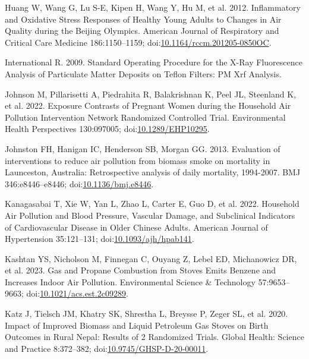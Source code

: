 \documentclass[
  letterpaper,
  DIV=11,
  numbers=noendperiod]{scrartcl}
\newlength{\cslhangindent}
\newlength{\cslentryspacingunit} %
\newenvironment{CSLReferences}[2] %
 {%
  \setlength{\parindent}{0pt}
  \ifodd #1
  \let\oldpar\par
  \def\par{\hangindent=\cslhangindent\oldpar}
  \fi
  \setlength{\parskip}{#2\cslentryspacingunit}
 }%
 {}
\begin{document}
\begin{CSLReferences}{1}{0}
\leavevmode{}%
Huang W, Wang G, Lu S-E, Kipen H, Wang Y, Hu M, et al. 2012.
Inflammatory and {Oxidative Stress Responses} of {Healthy Young Adults}
to {Changes} in {Air Quality} during the {Beijing Olympics}. American
Journal of Respiratory and Critical Care Medicine 186:1150--1159;
doi:\href{https://doi.org/10.1164/rccm.201205-0850OC}{10.1164/rccm.201205-0850OC}.

\leavevmode{}%
International R. 2009. Standard {Operating Procedure} for the {X-Ray
Fluorescence Analysis} of {Particulate Matter Deposits} on {Teflon
Filters}: {PM Xrf Analysis}.

\leavevmode{}%
Johnson M, Pillarisetti A, Piedrahita R, Balakrishnan K, Peel JL,
Steenland K, et al. 2022. Exposure {Contrasts} of {Pregnant Women}
during the {Household Air Pollution Intervention Network Randomized
Controlled Trial}. Environmental Health Perspectives 130:097005;
doi:\href{https://doi.org/10.1289/EHP10295}{10.1289/EHP10295}.

\leavevmode{}%
Johnston FH, Hanigan IC, Henderson SB, Morgan GG. 2013. Evaluation of
interventions to reduce air pollution from biomass smoke on mortality in
{Launceston}, {Australia}: Retrospective analysis of daily mortality,
1994-2007. BMJ 346:e8446--e8446;
doi:\href{https://doi.org/10.1136/bmj.e8446}{10.1136/bmj.e8446}.

\leavevmode{}%
Kanagasabai T, Xie W, Yan L, Zhao L, Carter E, Guo D, et al. 2022.
Household {Air Pollution} and {Blood Pressure}, {Vascular Damage}, and
{Subclinical Indicators} of {Cardiovascular Disease} in {Older Chinese
Adults}. American Journal of Hypertension 35:121--131;
doi:\href{https://doi.org/10.1093/ajh/hpab141}{10.1093/ajh/hpab141}.

\leavevmode{}%
Kashtan YS, Nicholson M, Finnegan C, Ouyang Z, Lebel ED, Michanowicz DR,
et al. 2023. Gas and {Propane Combustion} from {Stoves Emits Benzene}
and {Increases Indoor Air Pollution}. Environmental Science \&
Technology 57:9653--9663;
doi:\href{https://doi.org/10.1021/acs.est.2c09289}{10.1021/acs.est.2c09289}.

\leavevmode{}%
Katz J, Tielsch JM, Khatry SK, Shrestha L, Breysse P, Zeger SL, et al.
2020. Impact of {Improved Biomass} and {Liquid Petroleum Gas Stoves} on
{Birth Outcomes} in {Rural Nepal}: {Results} of 2 {Randomized Trials}.
Global Health: Science and Practice 8:372--382;
doi:\href{https://doi.org/10.9745/GHSP-D-20-00011}{10.9745/GHSP-D-20-00011}.


\end{CSLReferences}
\end{document}

